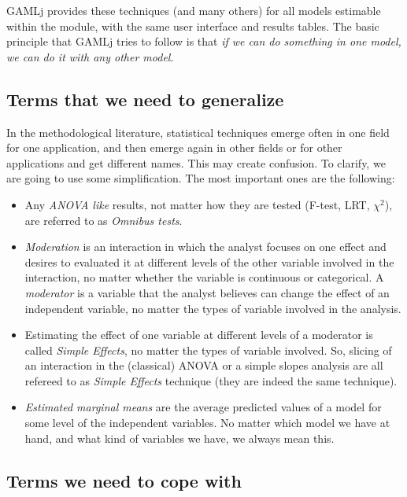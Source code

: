 \documentclass[
]{book}
\begin{document}
{GAMLj} provides these techniques (and many others) for all models estimable within the module, with the same user interface and results tables. The basic principle that {GAMLj} tries to follow is that \emph{if we can do something in one model, we can do it with any other model}.

\hypertarget{terms-that-we-need-to-generalize}{%
\subsection{Terms that we need to generalize}\label{terms-that-we-need-to-generalize}}

In the methodological literature, statistical techniques emerge often in one field for one application, and then emerge again in other fields or for other applications and get different names. This may create confusion. To clarify, we are going to use some simplification. The most important ones are the following:

\begin{itemize}
\item
  Any \emph{ANOVA like} results, not matter how they are tested (F-test, LRT, \(\chi^2\)), are referred to as \emph{Omnibus tests}.
\item
  \emph{Moderation} is an interaction in which the analyst focuses on one effect and desires to evaluated it at different levels of the other variable involved in the interaction, no matter whether the variable is continuous or categorical. A \emph{moderator} is a variable that the analyst believes can change the effect of an independent variable, no matter the types of variable involved in the analysis.
\item
  Estimating the effect of one variable at different levels of a moderator is called \emph{Simple Effects}, no matter the types of variable involved. So, slicing of an interaction in the (classical) ANOVA or a simple slopes analysis are all refereed to as \emph{Simple Effects} technique (they are indeed the same technique).
\item
  \emph{Estimated marginal means} are the average predicted values of a model for some level of the independent variables. No matter which model we have at hand, and what kind of variables we have, we always mean this.
\end{itemize}

\hypertarget{covnames}{%
\subsection{Terms we need to cope with}\label{covnames}}
\end{document}
